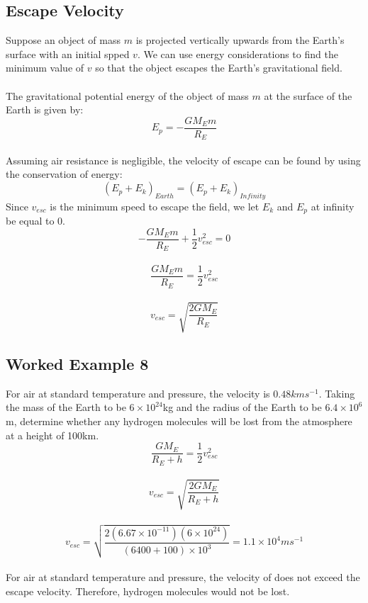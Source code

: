 \documentclass{article}
\begin{document}
\subsection{Escape Velocity}
Suppose an object of mass $m$ is projected vertically upwards from the Earth's surface with an initial spped $v$. 
We can use energy considerations to find the minimum value of $v$ so that the object escapes the Earth's gravitational field.
\\
\\The gravitational potential energy of the object of mass $m$ at the surface of the Earth is given by:
\begin{equation}
    E_p=-\frac{GM_E m}{R_E}
\end{equation}
\\Assuming air resistance is negligible, the velocity of escape can be found by using the conservation of energy:
\begin{equation}
    (E_p+E_k)_{Earth}=(E_p+E_k)_{Infinity}
\end{equation}
Since $v_{esc}$ is the minimum speed to escape the field, we let $E_k$ and $E_p$ at infinity be equal to $0$.
\begin{equation}
    -\frac{GM_Em}{R_E}+\frac{1}{2}v^2_{esc}=0
\end{equation}
\\
\begin{equation}
    \frac{GM_Em}{R_E}=\frac{1}{2}v^2_{esc}
\end{equation}
\\
\begin{equation}
    v_{esc}=\sqrt{\frac{2GM_E}{R_E}}
\end{equation}
\subsection*{Worked Example 8}
For air at standard temperature and pressure, the velocity is $0.48kms^{-1}$. Taking the mass of the Earth to be $6\times10^24$kg and the radius of the Earth to be $6.4\times10^6$m, determine whether any hydrogen molecules will be lost from the atmosphere at a height of 100km.
\begin{equation}
    \frac{GM_E}{R_E+h}=\frac{1}{2}v^2_{esc}
\end{equation}
\\
\begin{equation}
    v_{esc}=\sqrt{\frac{2GM_E}{R_E+h}}
\end{equation}
\\
\begin{equation}
    v_{esc}=\sqrt{\frac{2(6.67\times10^{-11})(6\times10^{24})}{(6400+100)\times10^3}}=1.1\times10^4ms^{-1}
\end{equation}
\\
For air at standard temperature and pressure, the velocity of does not exceed the escape velocity. Therefore, hydrogen molecules would not be lost.
\pagebreak
\end{document}
